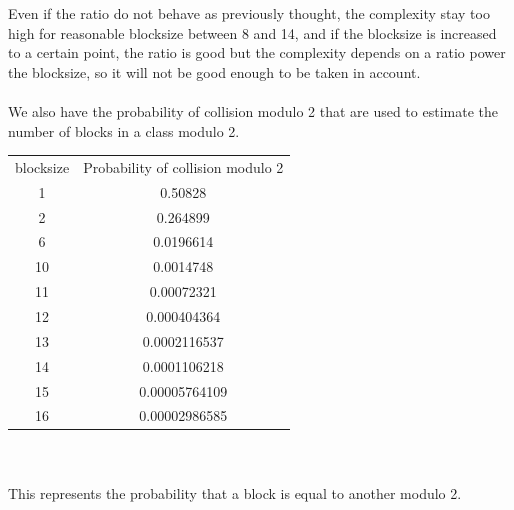 \documentclass{article}
\begin{document}
Even if the ratio do not behave as previously thought, the complexity stay too high for reasonable blocksize between 8 and 14, and if the blocksize is increased to a certain point, the ratio is good but the complexity depends on a ratio power the blocksize, so it will not be good enough to be taken in account.\\
\\
We also have the probability of collision modulo 2 that are used to estimate the number of blocks in a class modulo 2.\\
\begin{tabular}{|c|c|}
  \hline
  blocksize & Probability of collision modulo 2\\
	1 & 0.50828\\
	2 & 0.264899\\
	6 & 0.0196614\\
	10 & 0.0014748\\
	11 & 0.00072321\\ 
	12 & 0.000404364\\
	13 & 0.0002116537\\
	14 & 0.0001106218\\
	15 & 0.00005764109\\
	16 & 0.00002986585\\
	\hline
\end{tabular}\\
\\
This represents the probability that a block is equal to another modulo 2.\\
\end{document}
